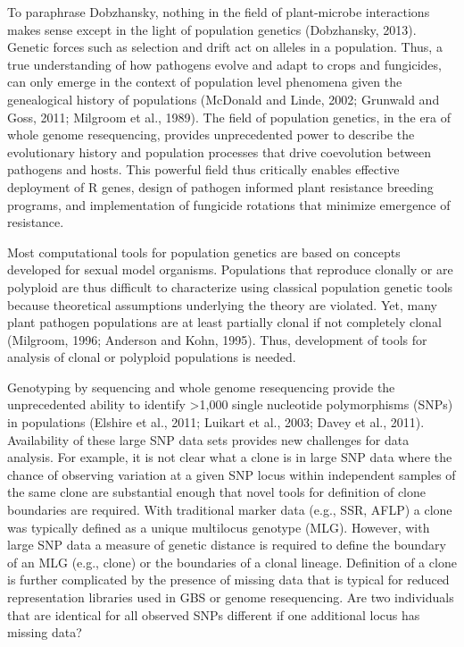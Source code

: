 \documentclass{frontiersSCNS} %
\begin{document}
To paraphrase Dobzhansky, nothing in the field of plant-microbe
interactions makes sense except in the light of population genetics
(Dobzhansky, 2013). Genetic forces such as selection and drift act on
alleles in a population. Thus, a true understanding of how pathogens
evolve and adapt to crops and fungicides, can only emerge in the context
of population level phenomena given the genealogical history of
populations (McDonald and Linde, 2002; Grunwald and Goss, 2011; Milgroom
et al., 1989). The field of population genetics, in the era of whole
genome resequencing, provides unprecedented power to describe the
evolutionary history and population processes that drive coevolution
between pathogens and hosts. This powerful field thus critically enables
effective deployment of R genes, design of pathogen informed plant
resistance breeding programs, and implementation of fungicide rotations
that minimize emergence of resistance.

Most computational tools for population genetics are based on concepts
developed for sexual model organisms. Populations that reproduce
clonally or are polyploid are thus difficult to characterize using
classical population genetic tools because theoretical assumptions
underlying the theory are violated. Yet, many plant pathogen populations
are at least partially clonal if not completely clonal (Milgroom, 1996;
Anderson and Kohn, 1995). Thus, development of tools for analysis of
clonal or polyploid populations is needed.

Genotyping by sequencing and whole genome resequencing provide the
unprecedented ability to identify \textgreater{}1,000 single nucleotide
polymorphisms (SNPs) in populations (Elshire et al., 2011; Luikart et
al., 2003; Davey et al., 2011). Availability of these large SNP data
sets provides new challenges for data analysis. For example, it is not
clear what a clone is in large SNP data where the chance of observing
variation at a given SNP locus within independent samples of the same
clone are substantial enough that novel tools for definition of clone
boundaries are required. With traditional marker data (e.g., SSR, AFLP)
a clone was typically defined as a unique multilocus genotype (MLG).
However, with large SNP data a measure of genetic distance is required
to define the boundary of an MLG (e.g., clone) or the boundaries of a
clonal lineage. Definition of a clone is further complicated by the
presence of missing data that is typical for reduced representation
libraries used in GBS or genome resequencing. Are two individuals that
are identical for all observed SNPs different if one additional locus
has missing data?
\end{document}
